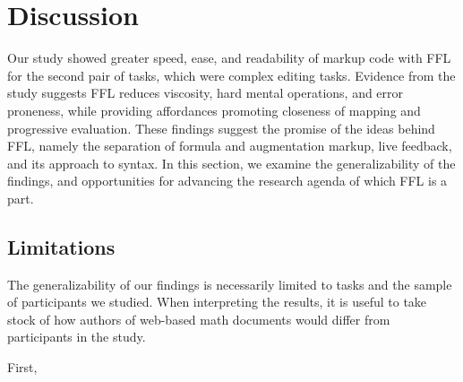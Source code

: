 \section{Discussion}

Our study showed greater speed, ease, and readability of markup code with FFL for the second pair of tasks, which were complex editing tasks. Evidence from the study suggests FFL reduces viscosity, hard mental operations, and error proneness, while providing affordances promoting closeness of mapping and progressive evaluation. These findings suggest the promise of the ideas behind FFL, namely the separation of formula and augmentation markup, live feedback, and its approach to syntax. In this section, we examine the generalizability of the findings, and opportunities for advancing the research agenda of which FFL is a part.


\subsection{Limitations}

The generalizability of our findings is necessarily limited to tasks and the sample of participants we studied. When interpreting the results, it is useful to take stock of how authors of web-based math documents would differ from participants in the study.


First, 

